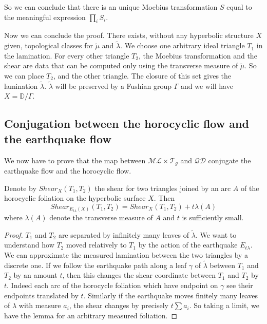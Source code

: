 So we can conclude that there is an unique Moebius transformation $S$ equal to the meaningful expression $\prod_i S_i$.

Now we can conclude the proof. There exists, without any hyperbolic structure $X$ given,  topological classes for $\tilde{\mu}$ and $\tilde{\lambda}$. We choose one arbitrary ideal triangle $T_1$ in the lamination. For every other triangle $T_2$, the Moebius transformation and the shear are data that can be computed only using the transverse measure of $\tilde{\mu}$. So we can place $T_2$, and the other triangle. The closure of this set gives the lamination $\tilde{\lambda}$. $\tilde{\lambda}$ will be preserved by a Fushian group $\Gamma$ and we will have $X=\mathbb{D}  / \Gamma$.

\subsection{Conjugation between the horocyclic flow and the earthquake flow}

We now have to prove that the map between $\mathcal{ML}\times \mathcal{T}_g $ and $\mathcal{QD}$ conjugate the earthquake flow and the horocyclic flow.

\begin{lem}\label{LemDer}
Denote by $Shear_X(T_1,T_2)$ the shear for two triangles joined by an arc $A$ of the horocyclic foliation on the hyperbolic surface $X$. Then \[
Shear_{E_{t \lambda}(X)}(T_1 ,T_2)= Shear_X(T_1,T_2)+t \lambda(A)
\]
where $\lambda(A)$ denote the transverse measure of $A$ and $t$ is sufficiently small.
\end{lem}

\begin{proof}
$T_1$ and $T_2$ are separated by infinitely many leaves of $\tilde{\lambda}$. We want to understand how $T_2$ moved relatively to $T_1$ by the action of the earthquake $E_{t \lambda}$.
We can approximate the measured lamination between the two triangles by a discrete one.
If we follow the earthquake path along a leaf $\gamma$ of $\tilde{\lambda}$ between $T_1$ and $T_2$ by an amount $t$, then this changes the shear coordinate between $T_1$ and $T_2$ by $t$. Indeed each arc of the horocycle foliation which have endpoint on $\gamma$ see their endpoints translated by $t$.
Similarly if the earthquake moves finitely many leaves of $\lambda$ with measure $a_i$, the shear changes by precisely $t \sum a_i$. So taking a limit, we have the lemma for an arbitrary measured foliation.
\end{proof}

